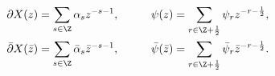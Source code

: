 \begin{equation}
\label{eq:fieldmodes}
\begin{aligned}
  \partial X(z) &= \sum_{s \in \Z} \alpha_s z^{-s-1}, \qquad & 
  \psi(z) &= \sum_{r \in \Z + \frac{1}{2}} \psi_r z^{-r-\frac{1}{2}}, \\
  \bar{\partial} X(\bar{z}) &= \sum_{s \in \Z} 
    \bar{\alpha}_s \bar{z}^{-s-1}, & 
  \bar{\psi}(\bar{z}) &= \sum_{r \in \Z + \frac{1}{2}} 
    \bar{\psi}_r \bar{z}^{-r-\frac{1}{2}}.
\end{aligned}
\end{equation}

